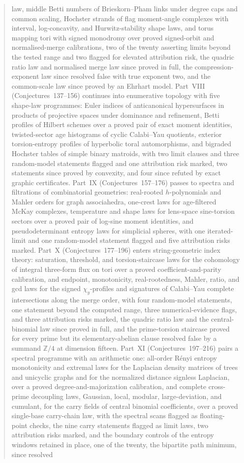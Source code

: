 \documentclass[11pt]{article}
\theoremstyle{definition}
\newcommand{\Z}{\mathbb Z}
\providecommand{\Z}{\mathbb Z}
\begin{document}
\begin{abstract}
law, middle Betti numbers of Brieskorn--Pham links under degree caps and common scaling, Hochster strands of flag moment-angle complexes with interval, log-concavity, and Hurwitz-stability shape laws, and torus mapping tori with signed monodromy over proved signed-orbit and normalised-merge calibrations, two of the twenty asserting limits beyond the tested range and two flagged for elevated attribution risk, the quadric ratio law and normalised merge law since proved in full, the compression-exponent law since resolved false with true exponent two, and the common-scale law since proved by an Ehrhart model.  Part~VIII (Conjectures~137--156) continues into enumerative topology with five shape-law programmes: Euler indices of anticanonical hypersurfaces in products of projective spaces under dominance and refinement, Betti profiles of Hilbert schemes over a proved pair of exact moment identities, twisted-sector age histograms of cyclic Calabi--Yau quotients, exterior torsion-entropy profiles of hyperbolic toral automorphisms, and bigraded Hochster tables of simple binary matroids, with two limit clauses and three random-model statements flagged and one attribution risk marked, two statements since proved by convexity, and four since refuted by exact graphic certificates.  Part~IX (Conjectures~157--176) passes to spectra and filtrations of combinatorial geometries: real-rooted $h$-polynomials and Mahler orders for graph associahedra, one-crest laws for age-filtered McKay complexes, temperature and shape laws for lens-space sine-torsion sectors over a proved pair of log-sine moment identities, and pseudodeterminant entropy laws for simplicial spheres, with one iterated-limit and one random-model statement flagged and five attribution risks marked.  Part~X (Conjectures~177--196) enters string-geometric index theory: saturation, threshold, and torsion-staircase laws for the cohomology of integral three-form flux on tori over a proved coefficient-and-parity calibration, and endpoint, monotonicity, real-rootedness, Mahler, ratio, and gcd laws for the signed $\chi_y$-profiles and signatures of Calabi--Yau complete intersections along the merge order, with four random-model statements, one statement beyond the computed range, three numerical-evidence flags, and three attribution risks marked, the quadric ratio law and the central-binomial law since proved in full, and the prime-torsion staircase proved for every prime but its elementary-abelian clause resolved false by a summand $\Z/4$ at dimension fifteen.  Part~XI (Conjectures~197--216) pairs a spectral programme with an arithmetic one: all-order R\'enyi entropy monotonicity and extremal laws for the Laplacian density matrices of trees and unicyclic graphs and for the normalized distance signless Laplacian, over a proved degree-and-majorization calibration, and complete cross-prime decoupling laws, Gaussian, local, modular, large-deviation, and cumulant, for the carry fields of central binomial coefficients, over a proved single-base carry-chain law, with the spectral scans flagged as floating-point checks, the nine carry statements flagged as limit laws, two attribution risks marked, and the boundary controls of the entropy windows retained in place, one of the twenty, the bipartite path minimum, since resolved 
\end{abstract}
\end{document}
